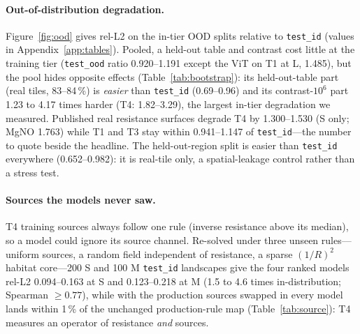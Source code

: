 \documentclass{article}
\newcommand{\relltwo}{rel-L2}
\newcommand{\code}[1]{\texttt{#1}}
\begin{document}
\paragraph{Out-of-distribution degradation.} Figure~\ref{fig:ood} gives \relltwo{} on the in-tier OOD splits relative to \code{test\_id} (values in Appendix~\ref{app:tables}). Pooled, a held-out table and contrast cost little at the training tier (\code{test\_ood} ratio 0.920--1.191 except the ViT on T1 at L, 1.485), but the pool hides opposite effects (Table~\ref{tab:bootstrap}): its held-out-table part (real tiles, 83--84\,\%) is \emph{easier} than \code{test\_id} (0.69--0.96) and its contrast-$10^6$ part 1.23 to 4.17 times harder (T4: 1.82--3.29), the largest in-tier degradation we measured. Published real resistance surfaces degrade T4 by 1.300--1.530 (S only; MgNO 1.763) while T1 and T3 stay within 0.941--1.147 of \code{test\_id}---the number to quote beside the headline. The held-out-region split is easier than \code{test\_id} everywhere (0.652--0.982): it is real-tile only, a spatial-leakage control rather than a stress test.

\paragraph{Sources the models never saw.} T4 training sources always follow one rule (inverse resistance above its median), so a model could ignore its source channel. Re-solved under three unseen rules---uniform sources, a random field independent of resistance, a sparse $(1/R)^2$ habitat core---200 S and 100 M \code{test\_id} landscapes give the four ranked models \relltwo{} 0.094--0.163 at S and 0.123--0.218 at M (1.5 to 4.6 times in-distribution; Spearman $\ge 0.77$), while with the production sources swapped in every model lands within 1\,\% of the unchanged production-rule map (Table~\ref{tab:source}): T4 measures an operator of resistance \emph{and} sources.
\end{document}
